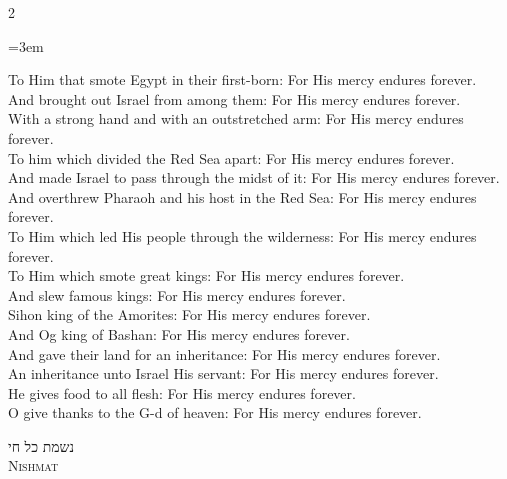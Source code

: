 \documentclass[11pt, openany]{book}
\newcommand{\sederdivider}{%
  \par\vspace{6pt}
  \begin{center}
    \textcolor{sedergold}{\pgfornament[width=1.5cm]{11}}
  \end{center}
  \par\vspace{6pt}
}
\newenvironment{bilingual}{%
  \par\vspace{4pt}%
  \begin{paracol}{2}%
}{%
  \end{paracol}%
  \par\vspace{2pt}%
}
\newenvironment{englishcol}{%
  \switchcolumn[0]%
  \begingroup
  \setstretch{1.4}%
  \emergencystretch=3em
  \tolerance=9999
  \normalsize
  \rightskip=0.12in\relax
}{%
  \endgroup
}
\newcommand{\subsedertitle}[2]{%
  \par\vspace{8pt}
  \begin{center}
    {\hebrewfontsanslarge\textcolor{sederblue}{\beginR #1\endR}}\\[3pt]
    {\normalsize\scshape\textcolor{sederblue}{#2}}
  \end{center}
  \par\vspace{3pt}
}
\begin{document}
\begin{bilingual}
\begin{englishcol}
To Him that smote Egypt in their first-born: For His mercy endures forever.\\[2pt]
And brought out Israel from among them: For His mercy endures forever.\\[2pt]
With a strong hand and with an outstretched arm: For His mercy endures forever.\\[2pt]
To him which divided the Red Sea apart: For His mercy endures forever.\\[2pt]
And made Israel to pass through the midst of it: For His mercy endures forever.\\[2pt]
And overthrew Pharaoh and his host in the Red Sea: For His mercy endures forever.\\[2pt]
To Him which led His people through the wilderness: For His mercy endures forever.\\[2pt]
To Him which smote great kings: For His mercy endures forever.\\[2pt]
And slew famous kings: For His mercy endures forever.\\[2pt]
Sihon king of the Amorites: For His mercy endures forever.\\[2pt]
And Og king of Bashan: For His mercy endures forever.\\[2pt]
And gave their land for an inheritance: For His mercy endures forever.\\[2pt]
An inheritance unto Israel His servant: For His mercy endures forever.\\[2pt]
He gives food to all flesh: For His mercy endures forever.\\[2pt]
O give thanks to the G-d of heaven: For His mercy endures forever.
\end{englishcol}
\end{bilingual}
\sederdivider

\subsedertitle{נשמת כל חי}{Nishmat}
\end{document}
